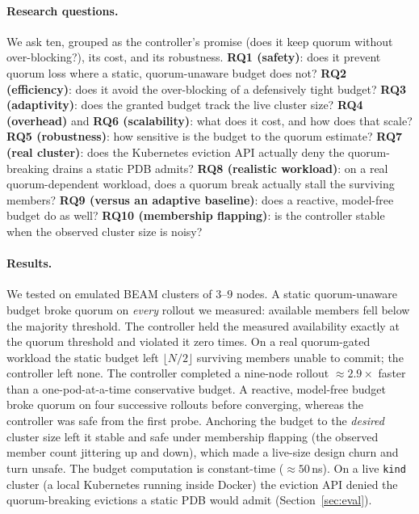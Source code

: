 \documentclass[AMA,Times1COL]{WileyNJDv5}
\begin{document}
\paragraph{Research questions.} We ask ten, grouped as the controller's promise (does it keep quorum
without over-blocking?), its cost, and its robustness. \textbf{RQ1 (safety)}: does it prevent quorum
loss where a static, quorum-unaware budget does not? \textbf{RQ2 (efficiency)}: does it avoid the
over-blocking of a defensively tight budget? \textbf{RQ3 (adaptivity)}: does the granted budget track
the live cluster size? \textbf{RQ4 (overhead)} and \textbf{RQ6 (scalability)}: what does it cost, and
how does that scale? \textbf{RQ5 (robustness)}: how sensitive is the budget to the quorum estimate?
\textbf{RQ7 (real cluster)}: does the Kubernetes eviction API actually deny the quorum-breaking drains a
static PDB admits? \textbf{RQ8 (realistic workload)}: on a real quorum-dependent workload, does a quorum
break actually stall the surviving members? \textbf{RQ9 (versus an adaptive baseline)}: does a reactive,
model-free budget do as well? \textbf{RQ10 (membership flapping)}: is the controller stable when the
observed cluster size is noisy?

\paragraph{Results.} We tested on emulated BEAM clusters of $3$--$9$ nodes. A static quorum-unaware
budget broke quorum on \emph{every} rollout we measured: available members fell below the majority
threshold. The controller held the measured availability exactly at the quorum threshold and violated it
zero times. On a real quorum-gated workload the static budget left $\lfloor N/2\rfloor$ surviving members
unable to commit; the controller left none. The controller completed a nine-node rollout
$\approx$$2.9\times$ faster than a one-pod-at-a-time conservative budget. A reactive, model-free budget
broke quorum on four successive rollouts before converging, whereas the controller was safe from the
first probe. Anchoring the budget to the \emph{desired} cluster size left it stable and safe under
membership flapping (the observed member count jittering up and down), which made a live-size design
churn and turn unsafe. The budget computation is constant-time ($\approx$$50$\,ns). On a live
\texttt{kind} cluster (a local Kubernetes running inside Docker) the eviction API denied the
quorum-breaking evictions a static PDB would admit (Section~\ref{sec:eval}).
\end{document}
